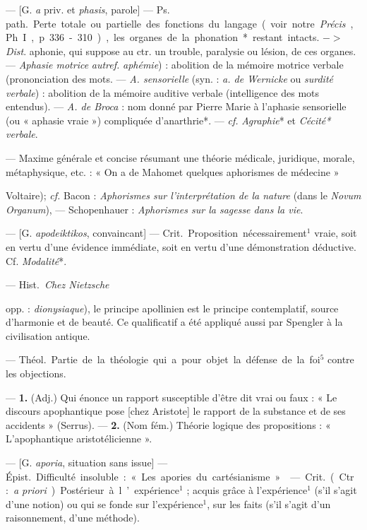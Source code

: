 \begin{itemize}[leftmargin=1cm, label=, itemsep=1pt]
 — [G. {\it a} priv. et {\it phasis}, parole]
— \si{Ps. path.} Perte totale ou partielle des fonctions du langage (voir
notre {\it Précis}, Ph. I, p. 336-310), les
organes de la phonation* restant
intacts. $->$ {\it Dist}. aphonie, qui suppose au ctr. un trouble, paralysie ou
lésion, de ces organes. — {\it Aphasie
motrice} {{\it autref.} {\it aphémie}) : abolition
de la mémoire motrice verbale (prononciation des mots}. — {\it A.
sensorielle} (syn. : {\it a. de Wernicke} ou {\it surdité verbale}) :
abolition de la mémoire
auditive verbale (intelligence des
mots entendus). — {\it A. de Broca} :
nom donné par Pierre Marie à
l'aphasie sensorielle (ou « aphasie
vraie ») compliquée d’anarthrie*. —
{\it cf.}  {\it Agraphie}* et {\it Cécité* verbale}.

 — Maxime générale et
concise résumant une théorie médicale, juridique, morale,
métaphysique, etc. : « On a de Mahomet quelques aphorismes
de médecine » {Voltaire); {\it cf.}  Bacon : {\it Aphorismes sur
l'interprétation de la nature} (dans le
{\it Novum Organum}), — Schopenhauer :
{\it Aphorismes sur la sagesse dans la vie}.

 — [G. {\it apodeiktikos}, convaincant] — \si{Crit.}
Proposition nécessairement$^1$ vraie,
soit en vertu d’une évidence immédiate, soit en vertu d’une
démonstration déductive. Cf.  {\it Modalité}*.

 — \si{Hist.} {\it Chez Nietzsche}
{opp. : {\it dionysiaque}), le principe
apollinien est le principe contemplatif, source d'harmonie et de
beauté. Ce qualificatif a été appliqué
aussi par Spengler à la civilisation
antique.

 — \si{Théol.} Partie de la
théologie qui a pour objet la défense
de la foi$^5$ contre les objections.

 — {\bf 1.} (Adj.) Qui énonce
un rapport susceptible d'être dit vrai
ou faux : « Le discours apophantique
pose [chez Aristote] le rapport de la
substance et de ses accidents » (Serrus). — {\bf 2.} (Nom fém.) Théorie
logique des propositions : « L’apophantique aristotélicienne ».

 — [G. {\it aporia}, situation sans issue]
— \si{Épist.} Difficulté insoluble : « Les
apories du cartésianisme. »

 — \si{Crit.} (Ctr. : {\it a priori}).
Postérieur à l’expérience$^1$ ; acquis
grâce à l'expérience$^1$ (s’il s’agit d'une
notion) ou qui se fonde sur l'expérience$^1$,
sur les faits (s’il s’agit d’un
raisonnement, d’une méthode).

}}
\end{itemize}
